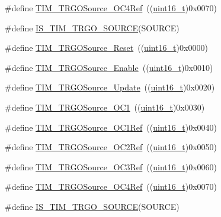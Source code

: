 \begin{DoxyCompactItemize}
\item 
\#define \hyperlink{group___t_i_m___trigger___output___source_gafc81561599199912d613c65f760919bc}{T\+I\+M\+\_\+\+T\+R\+G\+O\+Source\+\_\+\+O\+C4\+Ref}~((\hyperlink{_p_e___types_8h_a1f1825b69244eb3ad2c7165ddc99c956}{uint16\+\_\+t})0x0070)
\item 
\#define \hyperlink{group___t_i_m___trigger___output___source_gadf4e4e0422bd9c108b184884781d2d46}{I\+S\+\_\+\+T\+I\+M\+\_\+\+T\+R\+G\+O\+\_\+\+S\+O\+U\+R\+CE}(S\+O\+U\+R\+CE)
\item 
\#define \hyperlink{group___t_i_m___trigger___output___source_gafb039ed39279a4d1134b234797b1cdfb}{T\+I\+M\+\_\+\+T\+R\+G\+O\+Source\+\_\+\+Reset}~((\hyperlink{_p_e___types_8h_a1f1825b69244eb3ad2c7165ddc99c956}{uint16\+\_\+t})0x0000)
\item 
\#define \hyperlink{group___t_i_m___trigger___output___source_gaa228ba6cfafcf676e33e3ee35cb7fc1c}{T\+I\+M\+\_\+\+T\+R\+G\+O\+Source\+\_\+\+Enable}~((\hyperlink{_p_e___types_8h_a1f1825b69244eb3ad2c7165ddc99c956}{uint16\+\_\+t})0x0010)
\item 
\#define \hyperlink{group___t_i_m___trigger___output___source_ga8a73c717070ab1a0ef90326780f20aef}{T\+I\+M\+\_\+\+T\+R\+G\+O\+Source\+\_\+\+Update}~((\hyperlink{_p_e___types_8h_a1f1825b69244eb3ad2c7165ddc99c956}{uint16\+\_\+t})0x0020)
\item 
\#define \hyperlink{group___t_i_m___trigger___output___source_ga2d044b472c021f5484b9f71eb9ca69f1}{T\+I\+M\+\_\+\+T\+R\+G\+O\+Source\+\_\+\+O\+C1}~((\hyperlink{_p_e___types_8h_a1f1825b69244eb3ad2c7165ddc99c956}{uint16\+\_\+t})0x0030)
\item 
\#define \hyperlink{group___t_i_m___trigger___output___source_ga7cb70a2a026dc02136bdbb3dcc483d6c}{T\+I\+M\+\_\+\+T\+R\+G\+O\+Source\+\_\+\+O\+C1\+Ref}~((\hyperlink{_p_e___types_8h_a1f1825b69244eb3ad2c7165ddc99c956}{uint16\+\_\+t})0x0040)
\item 
\#define \hyperlink{group___t_i_m___trigger___output___source_ga059f9f6cf96c833180eb3cdf5e56bd04}{T\+I\+M\+\_\+\+T\+R\+G\+O\+Source\+\_\+\+O\+C2\+Ref}~((\hyperlink{_p_e___types_8h_a1f1825b69244eb3ad2c7165ddc99c956}{uint16\+\_\+t})0x0050)
\item 
\#define \hyperlink{group___t_i_m___trigger___output___source_ga40943bc1c3f22b983c683cbf0e87a218}{T\+I\+M\+\_\+\+T\+R\+G\+O\+Source\+\_\+\+O\+C3\+Ref}~((\hyperlink{_p_e___types_8h_a1f1825b69244eb3ad2c7165ddc99c956}{uint16\+\_\+t})0x0060)
\item 
\#define \hyperlink{group___t_i_m___trigger___output___source_gafc81561599199912d613c65f760919bc}{T\+I\+M\+\_\+\+T\+R\+G\+O\+Source\+\_\+\+O\+C4\+Ref}~((\hyperlink{_p_e___types_8h_a1f1825b69244eb3ad2c7165ddc99c956}{uint16\+\_\+t})0x0070)
\item 
\#define \hyperlink{group___t_i_m___trigger___output___source_gadf4e4e0422bd9c108b184884781d2d46}{I\+S\+\_\+\+T\+I\+M\+\_\+\+T\+R\+G\+O\+\_\+\+S\+O\+U\+R\+CE}(S\+O\+U\+R\+CE)
\end{DoxyCompactItemize}


